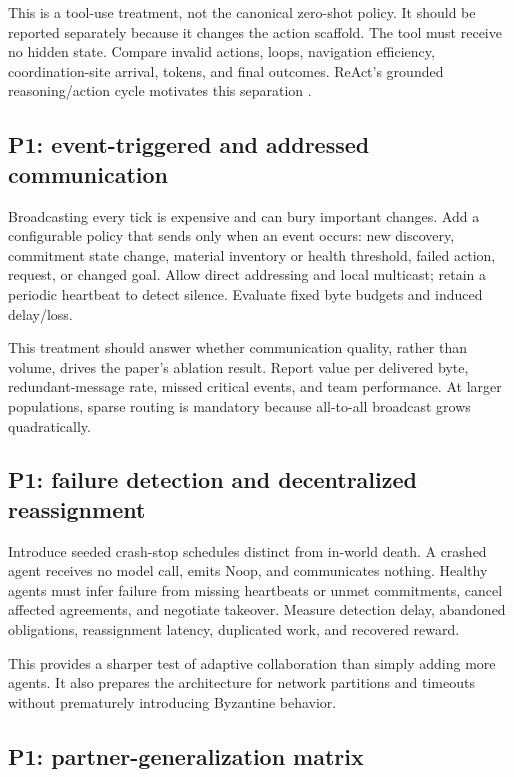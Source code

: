 \documentclass[11pt]{article}
\begin{document}
This is a tool-use treatment, not the canonical zero-shot policy.  It should be reported separately
because it changes the action scaffold.  The tool must receive no hidden state.  Compare invalid
actions, loops, navigation efficiency, coordination-site arrival, tokens, and final outcomes.  ReAct's
grounded reasoning/action cycle motivates this separation \cite{yao2023react}.

\subsection{P1: event-triggered and addressed communication}

Broadcasting every tick is expensive and can bury important changes.  Add a configurable policy
that sends only when an event occurs: new discovery, commitment state change, material inventory or
health threshold, failed action, request, or changed goal.  Allow direct addressing and local multicast;
retain a periodic heartbeat to detect silence.  Evaluate fixed byte budgets and induced delay/loss.

This treatment should answer whether communication quality, rather than volume, drives the paper's
ablation result.  Report value per delivered byte, redundant-message rate, missed critical events,
and team performance.  At larger populations, sparse routing is mandatory because all-to-all
broadcast grows quadratically.

\subsection{P1: failure detection and decentralized reassignment}

Introduce seeded crash-stop schedules distinct from in-world death.  A crashed agent receives no
model call, emits Noop, and communicates nothing.  Healthy agents must infer failure from missing
heartbeats or unmet commitments, cancel affected agreements, and negotiate takeover.  Measure
detection delay, abandoned obligations, reassignment latency, duplicated work, and recovered reward.

This provides a sharper test of adaptive collaboration than simply adding more agents.  It also
prepares the architecture for network partitions and timeouts without prematurely introducing
Byzantine behavior.

\subsection{P1: partner-generalization matrix}
\end{document}
